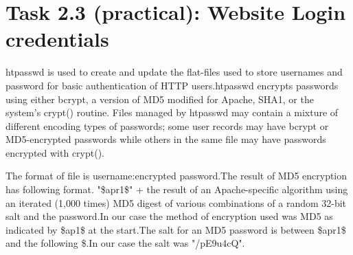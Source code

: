 \documentclass{article}
\begin{document}
\newpage
	\section*{Task 2.3 (practical): Website Login credentials}
htpasswd is used to create and update the flat-files used to store usernames and password for basic authentication of HTTP users.htpasswd encrypts passwords using either bcrypt, a version of MD5 modified for Apache, SHA1, or the system's crypt() routine. Files managed by htpasswd may contain a mixture of different encoding types of passwords; some user records may have bcrypt or MD5-encrypted passwords while others in the same file may have passwords encrypted with crypt().

The format of file is username:encrypted password.The result of MD5 encryption has following format.
"{\$}apr1{\$}" + the result of an Apache-specific algorithm using an iterated (1,000 times) MD5 digest of various combinations of a random 32-bit salt and the password.In our case the method of encryption used was MD5 as indicated by {\$}ap1{\$} at the start.The salt for an MD5 password is between {\$}apr1{\$} and the following {\$}.In our case the salt was "/pE9u4cQ". 
\end{document}
